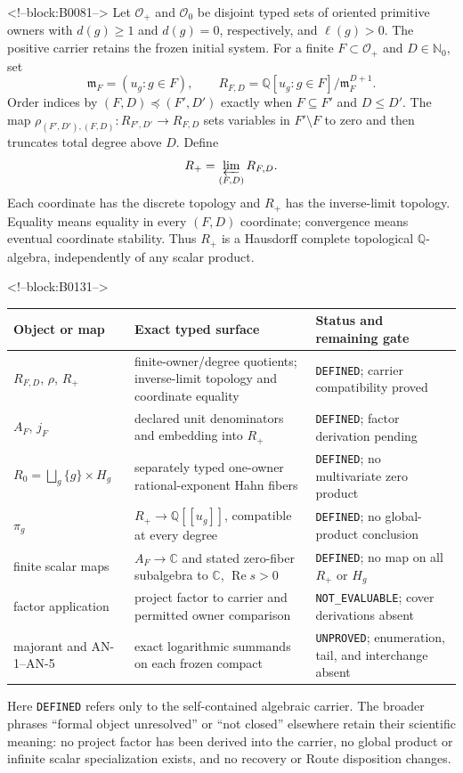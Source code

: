 \documentclass[11pt]{article}
\begin{document}
<!--block:B0081-->
Let \(\mathcal O_+\) and \(\mathcal O_0\) be disjoint typed sets of
oriented primitive owners with \(d(g)\geq1\) and \(d(g)=0\), respectively, and
\(\ell(g)>0\).  The positive carrier retains the frozen initial system.  For a
finite \(F\subset\mathcal O_+\) and \(D\in\mathbb N_0\), set
\[
 \mathfrak m_F=(u_g:g\in F),\qquad
 R_{F,D}=\mathbb Q[u_g:g\in F]/\mathfrak m_F^{D+1}.
\]
Order indices by \((F,D)\preceq(F',D')\) exactly when
\(F\subseteq F'\) and \(D\leq D'\).  The map
\(\rho_{(F',D'),(F,D)}:R_{F',D'}\to R_{F,D}\) sets variables in
\(F'\setminus F\) to zero and then truncates total degree above \(D\).  Define
\[
 R_+=\varprojlim_{(F,D)}R_{F,D}.
\]
Each coordinate has the discrete topology and \(R_+\) has the inverse-limit
topology.  Equality means equality in every \((F,D)\) coordinate; convergence
means eventual coordinate stability.  Thus \(R_+\) is a Hausdorff complete
topological \(\mathbb Q\)-algebra, independently of any scalar product.

<!--block:B0131-->
\begin{center}
\small
\begin{tabular}{@{}p{.21\linewidth}p{.41\linewidth}p{.29\linewidth}@{}}
\toprule
Object or map & Exact typed surface & Status and remaining gate \\
\midrule
\(R_{F,D}\), \(\rho\), \(R_+\) & finite-owner/degree quotients; inverse-limit topology and coordinate equality & \texttt{DEFINED}; carrier compatibility proved \\
\(A_F\), \(j_F\) & declared unit denominators and embedding into \(R_+\) & \texttt{DEFINED}; factor derivation pending \\
\(R_0=\bigsqcup_g\{g\}\times H_g\) & separately typed one-owner rational-exponent Hahn fibers & \texttt{DEFINED}; no multivariate zero product \\
\(\pi_g\) & \(R_+\to\mathbb Q[[u_g]]\), compatible at every degree & \texttt{DEFINED}; no global-product conclusion \\
finite scalar maps & \(A_F\to\mathbb C\) and stated zero-fiber subalgebra to \(\mathbb C\), \(\operatorname{Re}s>0\) & \texttt{DEFINED}; no map on all \(R_+\) or \(H_g\) \\
factor application & project factor to carrier and permitted owner comparison & \texttt{NOT\_EVALUABLE}; cover derivations absent \\
majorant and AN-1--AN-5 & exact logarithmic summands on each frozen compact & \texttt{UNPROVED}; enumeration, tail, and interchange absent \\
\bottomrule
\end{tabular}
\end{center}
Here \texttt{DEFINED} refers only to the self-contained algebraic carrier.  The
broader phrases ``formal object unresolved'' or ``not closed'' elsewhere retain
their scientific meaning: no project factor has been derived into the carrier,
no global product or infinite scalar specialization exists, and no recovery or
Route disposition changes.
\end{document}
